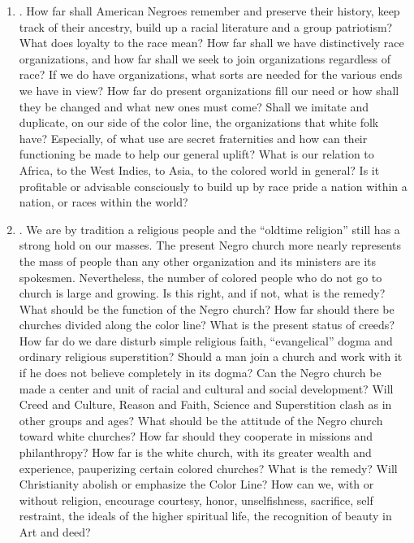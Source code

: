 \documentclass[letterpaper,10pt,english]{jupyterBook}
\begin{document}
\begin{enumerate}
\item {} 
\sphinxAtStartPar
{}. How far shall American Negroes remember and preserve their history, keep track of their ancestry, build up a racial literature and a group patriotism? What does loyalty to the race mean? How far shall we have distinctively race organizations, and how far shall we seek to join organizations regardless of race? If we do have organizations, what sorts are needed for the various ends we have in view? How far do present organizations fill our need or how shall they be changed and what new ones must come? Shall we imitate and duplicate, on our side of the color line, the organizations that white folk have? Especially, of what use are secret fraternities and how can their functioning be made to help our general uplift? What is our relation to Africa, to the West Indies, to Asia, to the colored world in general? Is it profitable or advisable consciously to build up by race pride a nation within a nation, or races within the world?

\item {} 
\sphinxAtStartPar
{}. We are by tradition a religious people and the “old\sphinxhyphen{}time religion” still has a strong hold on our masses. The present Negro church more nearly represents the mass of people than any other organization and its ministers are its spokesmen. Nevertheless, the number of colored people who do not go to church is large and growing. Is this right, and if not, what is the remedy? What should be the function of the Negro church? How far should there be churches divided along the color line? What is the present status of creeds? How far do we dare disturb simple religious faith, “evangelical” dogma and ordinary religious superstition? Should a man join a church and work with it if he does not believe completely in its dogma? Can the Negro church be made a center and unit of racial and cultural and social development? Will Creed and Culture, Reason and Faith, Science and Superstition clash as in other groups and ages? What should be the attitude of the Negro church toward white churches? How far should they co\sphinxhyphen{}operate in missions and philanthropy? How far is the white church, with its greater wealth and experience, pauperizing certain colored churches? What is the remedy? Will Christianity abolish or emphasize the Color Line? How can we, with or without religion, encourage courtesy, honor, unselfishness, sacrifice, self restraint, the ideals of the higher spiritual life, the recognition of beauty in Art and deed?


\end{enumerate}
\end{document}
